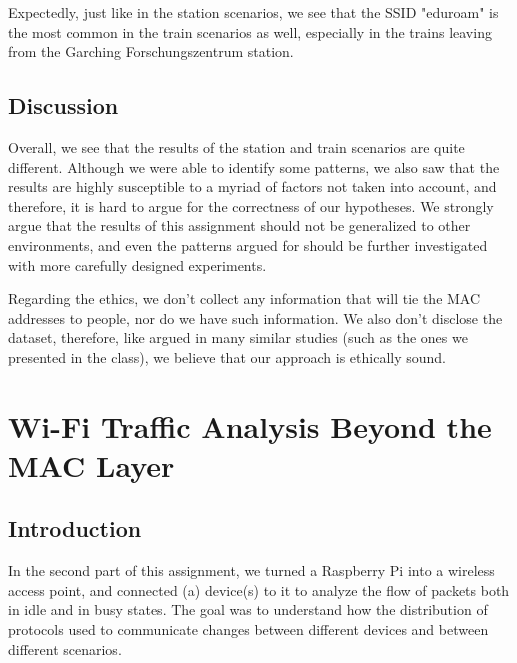 \documentclass[sigconf,nonacm]{acmart}
\begin{document}
Expectedly, just like in the station scenarios, we see that the SSID "eduroam" is the most common in the train scenarios as well, especially in the trains leaving from the Garching Forschungszentrum station.

\subsection{Discussion}
\label{sec:part-1/dis}

Overall, we see that the results of the station and train scenarios are quite different. Although we were able to identify some patterns, we also saw that the results are highly susceptible to a myriad of factors not taken into account, and therefore, it is hard to argue for the correctness of our hypotheses. We strongly argue that the results of this assignment should not be generalized to other environments, and even the patterns argued for should be further investigated with more carefully designed experiments.

Regarding the ethics, we don't collect any information that will tie the MAC addresses to people, nor do we have such information. We also don't disclose the dataset, therefore, like argued in many similar studies (such as the ones we presented in the class), we believe that our approach is ethically sound.


\section{Wi-Fi Traffic Analysis Beyond the MAC Layer}
\label{sec:part-2}

\subsection{Introduction}
\label{sec:part-2/desc}


In the second part of this assignment, we turned a Raspberry Pi into a wireless access point, and connected (a) device(s) to it to analyze the flow of packets both in idle and in busy states. The goal was to understand how the distribution of protocols used to communicate changes between different devices and between different scenarios.
\end{document}
